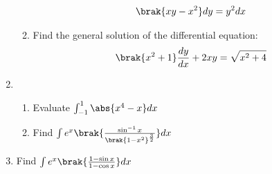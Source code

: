 \begin{enumerate}
\begin{enumerate}
\begin{align}
            \brak{xy-x^2}dy = y^2dx
          \end{align}
	\item Find the general solution of the  differential equation:
           \begin{align}
                \brak{x^2+1}\frac{dy}{dx}+2xy=\sqrt{x^2+4}
           \end{align}
    \end{enumerate}
    \item
    \begin{enumerate}
        \item Evaluate $\int^{1}_{-1} \abs{x^4-x}dx$
        \item Find $\int e^x\brak{\frac{\sin^{-1}x}{\brak{1-x^2}^\frac{3}{2}}}dx
 $
    \end{enumerate}
    \item Find $\int e^x\brak{\frac{1-\sin x}{1-\cos x}}dx$

\end{enumerate}
%


